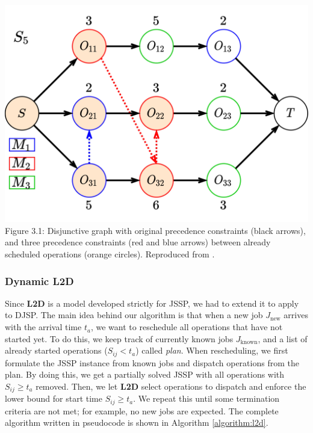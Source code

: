 \begin{center}
    \includegraphics[width=0.75\linewidth]{images/jssp_adding_arcs.pdf}\\
    Figure 3.1: Disjunctive graph with original precedence constraints (black arrows), and three precedence constraints (red and blue arrows) between already scheduled operations (orange circles). Reproduced from \cite{zhang2020learning}.
\end{center}

\subsubsection{Dynamic L2D}

Since \textbf{L2D} is a model developed strictly for JSSP, we had to extend it to apply to DJSP. The main idea behind our algorithm is that when a new job $J_\text{new}$ arrives with the arrival time $t_a$, we want to reschedule all operations that have not started yet. To do this, we keep track of currently known jobs $J_\text{known}$, and a list of already started operations ($S_{ij} < t_a$) called \textit{plan}. When rescheduling, we first formulate the JSSP instance from known jobs and dispatch operations from the plan. By doing this, we get a partially solved JSSP with all operations with $S_{ij} \geq t_a$ removed. Then, we let \textbf{L2D} select operations to dispatch and enforce the lower bound for start time $S_{ij} \geq  t_a$. We repeat this until some termination criteria are not met; for example, no new jobs are expected. The complete algorithm written in pseudocode is shown in Algorithm \ref{algorithm:l2d}.

